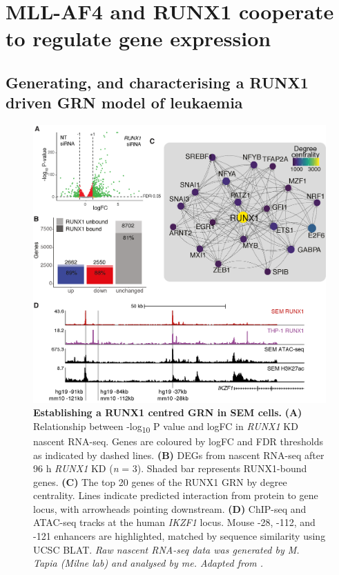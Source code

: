 \section{\label{ch4:mll-af4-runx1}MLL-AF4 and RUNX1 cooperate to regulate gene expression}

\subsection{Generating, and characterising a RUNX1 driven GRN model of leukaemia}

\begin{figure}[!b]
    \centering
    \includegraphics[width=\textwidth,height=\textheight,keepaspectratio]{figures/chapter4/chr4_runx1-grn.png}
    \caption[{Establishing a RUNX1 centred GRN in SEM cells.}]
    {\textbf{Establishing a RUNX1 centred GRN in SEM cells.} 
    \textbf{(A)} Relationship between -log\textsubscript{10} P value and logFC in \textit{RUNX1} KD nascent RNA-seq. Genes are coloured by logFC and FDR thresholds as indicated by dashed lines.
    \textbf{(B)} DEGs from nascent RNA-seq after 96 h \textit{RUNX1} KD (\textit{n} = 3). Shaded bar represents RUNX1-bound genes.
    \textbf{(C)} The top 20 genes of the RUNX1 GRN by degree centrality. Lines indicate predicted interaction from protein to gene locus, with arrowheads pointing downstream. 
    \textbf{(D)} ChIP-seq and ATAC-seq tracks at the human \textit{IKZF1} locus. Mouse -28, -112, and -121 enhancers are highlighted, matched by sequence similarity using UCSC BLAT. 
    \textit{Raw nascent RNA-seq data was generated by M. Tapia (Milne lab) and analysed by me. Adapted from \cite{harman_kmt2a-aff1_2021}.}
    } 
    \label{fig:ch4_runx1-grn}
\end{figure}

